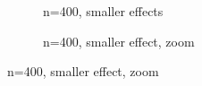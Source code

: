 \documentclass[12pt,a4paper]{article}
\begin{document}
\begin{figure}[h]
\centering
\caption{\footnotesize [TODO].}	
	\begin{subfigure}{.5\textwidth}
	  \centering
	  \caption{n=400, smaller effects}  %
	\end{subfigure}%
	\begin{subfigure}{.5\textwidth}
	  \centering
	  \caption{n=400, smaller effect, zoom} %
	\end{subfigure}
\end{figure}
\end{document}
